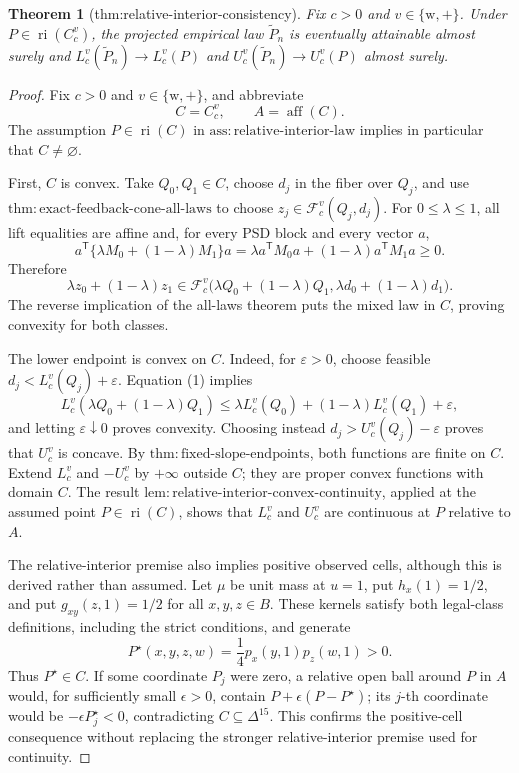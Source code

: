 \documentclass{article}
\newtheorem{theorem}{Theorem}
\begin{document}
\begin{theorem}[thm:relative-interior-consistency]\label{thm:relative-interior-consistency}
Fix \(c>0\) and \(v\in\{\mathrm w,+\}\). Under \(P\in\operatorname{ri}(C_c^v)\), the projected empirical law \(\widetilde P_n\) is eventually attainable almost surely and \(L_c^v(\widetilde P_n)\to L_c^v(P)\) and \(U_c^v(\widetilde P_n)\to U_c^v(P)\) almost surely.
\end{theorem}
\begin{proof}
Fix \(c>0\) and \(v\in\{\mathrm w,+\}\), and abbreviate
\[
 C=C_c^v,
 \qquad A=\operatorname{aff}(C).
\]
The assumption \(P\in\operatorname{ri}(C)\) in \(\mathrm{ass{:}relative\text{-}interior\text{-}law}\) implies in particular that \(C\ne\varnothing\).

First, \(C\) is convex.  Take \(Q_0,Q_1\in C\), choose \(d_j\) in the fiber over \(Q_j\), and use \(\mathrm{thm{:}exact\text{-}feedback\text{-}cone\text{-}all\text{-}laws}\) to choose \(z_j\in\mathcal F_c^v(Q_j,d_j)\).  For \(0\le\lambda\le1\), all lift equalities are affine and, for every PSD block and every vector \(a\),
\[
 a^{\mathsf T}\{\lambda M_0+(1-\lambda)M_1\}a
 =\lambda a^{\mathsf T}M_0a+(1-\lambda)a^{\mathsf T}M_1a\ge0.
\]
Therefore
\[
 \lambda z_0+(1-\lambda)z_1
 \in\mathcal F_c^v\bigl(\lambda Q_0+(1-\lambda)Q_1,
 \lambda d_0+(1-\lambda)d_1\bigr). \tag{1}
\]
The reverse implication of the all-laws theorem puts the mixed law in \(C\), proving convexity for both classes.

The lower endpoint is convex on \(C\).  Indeed, for \(\varepsilon>0\), choose feasible \(d_j<L_c^v(Q_j)+\varepsilon\).  Equation (1) implies
\[
 L_c^v(\lambda Q_0+(1-\lambda)Q_1)
 \le\lambda L_c^v(Q_0)+(1-\lambda)L_c^v(Q_1)+\varepsilon,
\]
and letting \(\varepsilon\downarrow0\) proves convexity.  Choosing instead \(d_j>U_c^v(Q_j)-\varepsilon\) proves that \(U_c^v\) is concave.  By \(\mathrm{thm{:}fixed\text{-}slope\text{-}endpoints}\), both functions are finite on \(C\).  Extend \(L_c^v\) and \(-U_c^v\) by \(+\infty\) outside \(C\); they are proper convex functions with domain \(C\).  The result \(\mathrm{lem{:}relative\text{-}interior\text{-}convex\text{-}continuity}\), applied at the assumed point \(P\in\operatorname{ri}(C)\), shows that \(L_c^v\) and \(U_c^v\) are continuous at \(P\) relative to \(A\).

The relative-interior premise also implies positive observed cells, although this is derived rather than assumed.  Let \(\mu\) be unit mass at \(u=1\), put \(h_x(1)=1/2\), and put \(g_{xy}(z,1)=1/2\) for all \(x,y,z\in B\).  These kernels satisfy both legal-class definitions, including the strict conditions, and generate
\[
 P^\star(x,y,z,w)=\frac14p_x(y,1)p_z(w,1)>0. \tag{2}
\]
Thus \(P^\star\in C\).  If some coordinate \(P_j\) were zero, a relative open ball around \(P\) in \(A\) would, for sufficiently small \(\epsilon>0\), contain \(P+\epsilon(P-P^\star)\); its \(j\)-th coordinate would be \(-\epsilon P_j^\star<0\), contradicting \(C\subseteq\Delta^{15}\).  This confirms the positive-cell consequence without replacing the stronger relative-interior premise used for continuity.


\end{proof}
\end{document}
